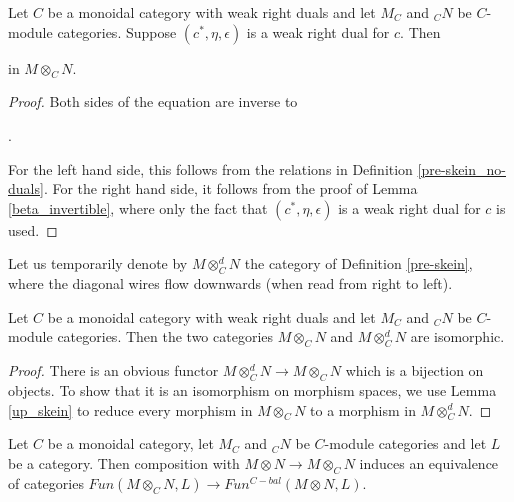 \begin{lemma}\label{up_skein}
  
  \noindent Let $C$ be a monoidal category with weak right duals and let $M_C$
  and $_{C}N$ be $C$-module categories. Suppose $(c^*,\eta,\epsilon)$ is a
  weak right dual for $c$.
  Then \begin{center}\end{center} in
  $M\otimes_C N$.
\end{lemma}

\begin{proof}
  Both sides of the equation are inverse
  to \begin{center}.\end{center} For the left hand
  side, this follows from the relations in Definition
  \ref{pre-skein_no-duals}. For the right hand side, it follows from the proof
  of Lemma \ref{beta_invertible}, where only the fact that
  $(c^*,\eta,\epsilon)$ is a weak right dual for $c$ is used.
\end{proof}

Let us temporarily denote by $M\otimes_C^d N$ the category of Definition
\ref{pre-skein}, where the diagonal wires flow downwards (when read from right to left).

\begin{lemma}\label{equivalent_preskeins}
  
  \noindent Let $C$ be a monoidal category with weak right duals and let $M_C$
  and $_{C}N$ be $C$-module categories. Then the two categories $M\otimes_C N$
  and $M\otimes^{d}_C N$ are isomorphic.
\end{lemma}

\begin{proof}
  There is an obvious functor $M\otimes_C^d N\to M\otimes_C N$ which is a
  bijection on objects. To show that it is an isomorphism on morphism spaces,
  we use Lemma \ref{up_skein} to reduce every morphism in $M\otimes_C N$ to a
  morphism in $M\otimes^d_C N$.
\end{proof}

\begin{proposition}

  \noindent Let $C$ be a monoidal category, let $M_C$ and $_{C}N$ be
  $C$-module categories and let $L$ be a category. Then composition with
  $M\otimes N \to M\otimes_C N$ induces an equivalence of categories
  $Fun(M\otimes_C N,L)\to Fun^{C-bal}(M\otimes N,L)$.
\end{proposition}

